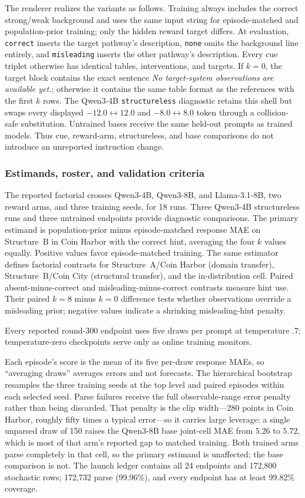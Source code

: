 The renderer realizes the variants as follows. Training always includes the
correct strong/weak background and uses the same input string for episode-matched and
population-prior training; only the hidden reward target differs. At evaluation,
\texttt{correct} inserts the target pathway's description, \texttt{none} omits
the background line entirely, and \texttt{misleading} inserts the other
pathway's description. Every cue triplet otherwise has identical tables,
interventions, and targets. If $k=0$, the target block contains the exact
sentence \emph{No target-system observations are available yet.}; otherwise it
contains the same table format as the references with the first $k$ rows. The
Qwen3-4B \texttt{structureless} diagnostic retains this shell but swaps every
displayed $-12.0\leftrightarrow12.0$ and $-8.0\leftrightarrow8.0$ token through
a collision-safe substitution. Untrained bases receive the same held-out
prompts as trained models. Thus cue, reward-arm, structureless, and base
comparisons do not introduce an unreported instruction change.

\subsubsection{Estimands, roster, and validation criteria}

The reported factorial crosses Qwen3-4B, Qwen3-8B, and Llama-3.1-8B, two reward
arms, and three training seeds, for 18 runs. Three Qwen3-4B structureless runs
and three untrained endpoints provide diagnostic comparisons.
The primary estimand is population-prior minus episode-matched response MAE on
Structure~B in Coin Harbor with the correct hint, averaging the four $k$ values
equally. Positive values favor episode-matched training. The same estimator defines
factorial contrasts for Structure~A/Coin Harbor (domain transfer),
Structure~B/Coin City (structural transfer), and the in-distribution cell.
Paired absent-minus-correct and misleading-minus-correct contrasts measure hint
use. Their paired $k=8$ minus $k=0$ difference tests whether observations override
a misleading prior; negative values indicate a shrinking misleading-hint penalty.

Every reported round-300 endpoint uses five draws per prompt at temperature $.7$;
temperature-zero checkpoints serve only as online training monitors.

Each episode's score is the mean of its five per-draw response MAEs, so ``averaging
draws'' averages errors and not forecasts. The hierarchical bootstrap
resamples the three training seeds at the top level and paired episodes within
each selected seed. Parse failures receive the full observable-range error
penalty rather than being discarded. That penalty is the clip width---280 points
in Coin Harbor, roughly fifty times a typical error---so it carries large
leverage: a single unparsed draw of 150 raises the Qwen3-8B base joint-cell MAE
from $5.26$ to $5.72$, which is most of that arm's reported gap to matched
training. Both trained arms parse completely in that cell, so the primary
estimand is unaffected; the base comparison is not.
The launch ledger contains all 24 endpoints and 172,800 stochastic rows;
172,732 parse (99.96\%), and every endpoint has at least 99.82\% coverage.

